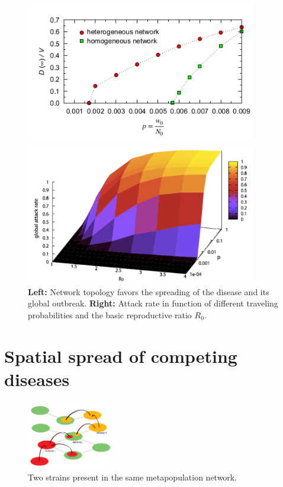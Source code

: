 \documentclass[../main/main.tex]{subfiles}
\begin{document}
\begin{figure}[h!]
\begin{minipage}[c]{0.5\linewidth}
\centering
\includegraphics[width=0.9\textwidth]{../lessons/image/16/image06a.png}
\end{minipage}
\begin{minipage}[]{0.5\linewidth}
\centering
\includegraphics[width=0.9\textwidth]{../lessons/image/16/image06b.png}
\end{minipage}
\caption{\label{fig:16_06} \textbf{Left:} Network topology favors the spreading of the disease and its global outbreak. \textbf{Right:} Attack rate in function of different traveling probabilities and the basic reproductive ratio $R_0$.}
\end{figure}

\section{Spatial spread of competing diseases}

\begin{figure}[h!]
\centering
\includegraphics[width=0.34\textwidth]{../lessons/image/16/image07.png}
\caption{\label{fig:16_07} Two strains present in the same metapopulation network.}
\end{figure}
\end{document}
